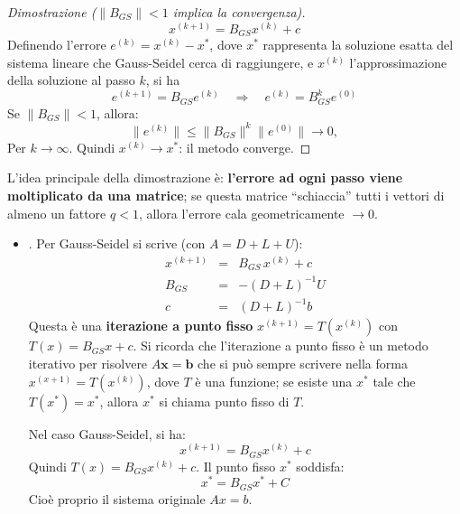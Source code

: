 \begin{itemize}
\begin{proof}[Dimostrazione ($\left\| B_{GS} \right\| < 1$ implica la convergenza)]
\begin{equation*}
            x^{(k+1)} = B_{GS}x^{(k)} + c
        \end{equation*}
        Definendo l'errore $e^{(k)} = x^{(k)} - x^{*}$, dove $x^{*}$ rappresenta la soluzione esatta del sistema lineare che Gauss-Seidel cerca di raggiungere, e $x^{(k)}$ l'approssimazione della soluzione al passo $k$, si ha
        \begin{equation*}
            e^{(k+1)} = B_{GS} e^{(k)} \quad \Rightarrow \quad e^{(k)} = B_{GS}^k e^{(0)}
        \end{equation*}
        Se $\|B_{GS}\| < 1$, allora:
        \begin{equation*}
            \|e^{(k)}\| \le \|B_{GS}\|^k \|e^{(0)}\| \to 0,
        \end{equation*}
        Per $k \to \infty$. Quindi $x^{(k)} \to x^\ast$: il metodo converge.
    \end{proof}

    \begin{deepeningbox}
        L'idea principale della dimostrazione è: \textbf{l'errore ad ogni passo viene moltiplicato da una matrice}; se questa matrice ``schiaccia'' tutti i vettori di almeno un fattore $q < 1$, allora l'errore cala geometricamente $\to 0$.

        \begin{itemize}
            \item {}. Per Gauss-Seidel si scrive (con $A = D + L + U$):
            \begin{equation*}
                \begin{array}{rcl}
                    x^{(k+1)} &=& B_{GS}\,x^{(k)} + c \\ [.3em]
                    B_{GS} &=& -(D+L)^{-1}U \\ [.3em]
                    c &=& (D+L)^{-1}b
                \end{array}
            \end{equation*}
            Questa è una \textbf{iterazione a punto fisso} $x^{(k+1)}=T(x^{(k)})$ con $T(x)=B_{GS}x+c$. Si ricorda che l'iterazione a punto fisso è un metodo iterativo per risolvere $A\mathbf{x} = \mathbf{b}$ che si può sempre scrivere nella forma $x^{(x+1)} = T(x^{(k)})$, dove $T$ è una funzione; se esiste una $x^{*}$ tale che $T(x^{*}) = x^{*}$, allora $x^{*}$ si chiama punto fisso di $T$.

            \highspace
            Nel caso Gauss-Seidel, si ha:
            \begin{equation*}
                x^{(k+1)} = B_{GS} x^{(k)} + c
            \end{equation*}
            Quindi $T(x) = B_{GS} x^{(k)} + c$. Il punto fisso $x^{*}$ soddisfa:
            \begin{equation*}
                x^{*} = B_{GS} x^{*} + C
            \end{equation*}
            Cioè proprio il sistema originale $Ax = b$.



\end{itemize}
\end{deepeningbox}
\end{itemize}
